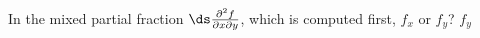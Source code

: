 {In the mixed partial fraction $\ds \frac{\partial^2f}{\partial x\partial y}$, which is computed first, $f_x$ or $f_y$?
}
{$f_y$
}